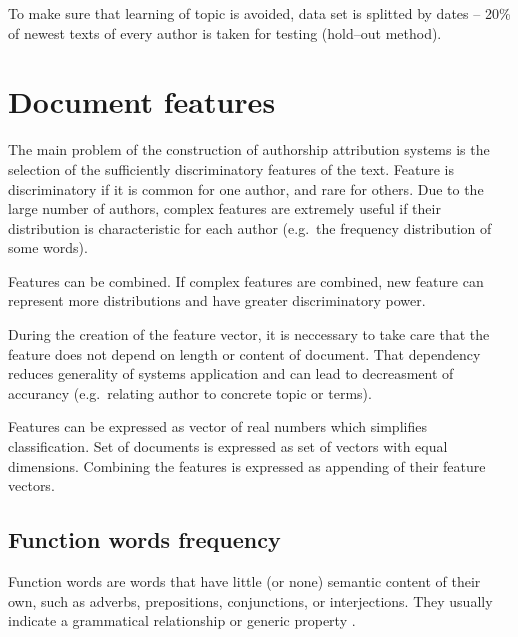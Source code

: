 \documentclass[11pt,english]{article}
\begin{document}
\begin{multicols}{2}
To make sure that learning of topic is avoided, data set is splitted by dates
-- 20\% of newest texts of every author is taken for testing (hold--out method).

\begin{minipage}{0.8\linewidth}
\vspace{10pt}
\centerline{\resizebox{1.4\linewidth}{!}{}}%
%
\label{fig:articlesPerAuthor}
\end{minipage}

\section{Document features}
The main problem of the construction of authorship attribution systems is the
selection of the sufficiently discriminatory features of the text. Feature is
discriminatory if it is common for one author, and rare for others. Due to the
large number of authors, complex features are extremely useful if their
distribution is characteristic for each author (e.g.\ the frequency distribution
of some words).

Features can be combined. If complex features are combined, new feature can
represent more distributions and have greater discriminatory power.

During the creation of the feature vector, it is neccessary to take care that the
feature does not depend on length or content of document. That dependency reduces
generality of systems application and can lead to decreasment of accurancy
(e.g.\ relating author to concrete topic or terms).

Features can be expressed as vector of real numbers which simplifies
classification. Set of documents is expressed as set of vectors with equal dimensions.
Combining the features is expressed as appending of their feature
vectors.



\subsection{Function words frequency}
\label{sec:funkcijske-rijeci}
Function words are words that have little (or none) semantic content of their
own, such as adverbs, prepositions, conjunctions, or interjections. They usually
indicate a grammatical relationship or generic property
\citep{zhao2005effective}.


\end{multicols}
\end{document}
